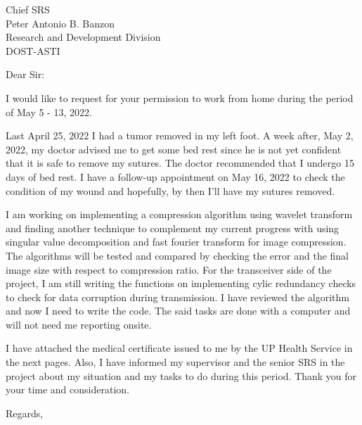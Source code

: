 \documentclass{letter}
\begin{document}
\begin{letter}{Chief SRS \\ Peter Antonio B. Banzon \\ Research and Development Division\\DOST-ASTI}
\opening{Dear Sir:}

I would like to request for your permission to work from home during the period of May 5 - 13, 2022.

Last April 25, 2022 I had a tumor removed in my left foot.
A week after, May 2, 2022, my doctor advised me to get some bed rest since he is not yet confident that it is safe to remove my sutures. 
The doctor recommended that I undergo 15 days of bed rest.
I have a follow-up appointment on May 16, 2022 to check the condition of my wound and hopefully, by then I'll have my sutures removed.

I am working on implementing a compression algorithm using wavelet transform and finding another technique to complement my current progress with using  singular value decomposition and fast fourier transform for image compression.
The algorithms will be tested and compared by checking the error and the final image size with respect to compression ratio. For the transceiver side of the project, I am still writing the functions on implementing cylic redundancy checks to check for data corruption during transmission. I have reviewed the algorithm and now I need to write the code.  The said tasks are done with a computer and will not need me reporting onsite.

I have attached the medical certificate issued to me by the UP Health Service in the next pages. Also, I have informed my supervisor and the senior SRS in the project about my situation and my tasks to do during this period.
Thank you for your time and consideration.
\\
\closing{Regards,}



\end{letter}
\end{document}
